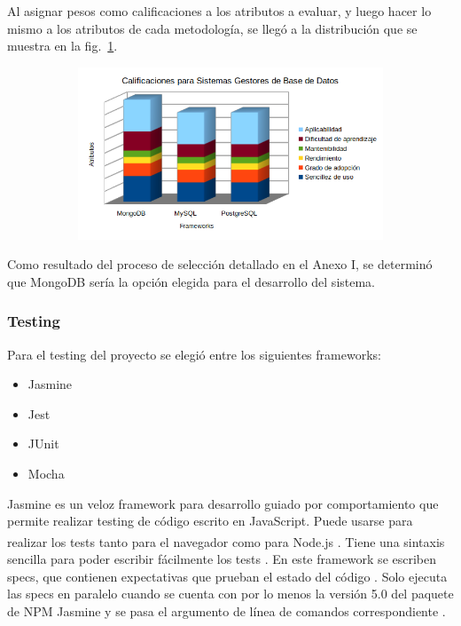 \documentclass{article}
\begin{document}
Al asignar pesos como calificaciones a los atributos a evaluar, y luego hacer lo mismo a los atributos de cada metodología, se llegó a la distribución que se muestra en la fig.~\ref{fig:dbms}.
\begin{figure}[H]
	\caption{Calificaciones para Sistemas Gestores de Base de Datos}
    \begin{subfigure}{1\textwidth}
	\includegraphics[width=1\textwidth]{calificaciones para dbms.png}
    \end{subfigure}
	\label{fig:dbms}
\end{figure}
\vspace{-1.0\baselineskip}
Como resultado del proceso de selección detallado en el Anexo I, se determinó que MongoDB sería la opción elegida para el desarrollo del sistema.
\subsubsection{Testing}
Para el testing del proyecto se elegió entre los siguientes frameworks:
\begin{itemize}
    \item Jasmine
    \item Jest
    \item JUnit
    \item Mocha
\end{itemize}
Jasmine es un veloz framework para desarrollo guiado por comportamiento que permite realizar testing de código escrito en JavaScript. Puede usarse para realizar los tests tanto para el navegador como para Node.js \textsuperscript{\textregistered}. Tiene una sintaxis sencilla para poder escribir fácilmente los tests \parencite{jasmineOfficialHome}. En este framework se escriben specs, que contienen expectativas que prueban el estado del código \parencite{jasmineYourFirstSuite}. Solo ejecuta las specs en paralelo cuando se cuenta con por lo menos la versión 5.0 del paquete de NPM Jasmine y se pasa el argumento de línea de comandos correspondiente \parencite{jasmineFrequentlyAskedQuestions}. 
\end{document}
